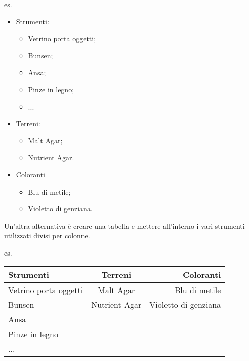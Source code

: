 es.
\begin{multicols}{2}
\begin{itemize}
    \item Strumenti:
    \begin{itemize}
        \item Vetrino porta oggetti;
        \item Bunsen;
        \item Ansa;
        \item Pinze in legno;
        \item ...
    \end{itemize}
    \item Terreni:
    \begin{itemize}
    \item Malt Agar;
    \item Nutrient Agar.
    \end{itemize}
    \item Coloranti
    \begin{itemize}
        \item Blu di metile;
        \item Violetto di genziana.
    \end{itemize}
\end{itemize}
\end{multicols}

Un'altra alternativa è creare una tabella e mettere all'interno i vari strumenti utilizzati divisi per colonne.

es.
\begin{center}
   \begin{tabular}{l|c|r}
   \toprule
     \textbf{Strumenti} &  \textbf{Terreni} & \textbf{Coloranti}\\
    \midrule
     Vetrino porta oggetti & Malt Agar & Blu di metile\\
     Bunsen & Nutrient Agar & Violetto di genziana\\
     Ansa & & \\
     Pinze in legno & & \\
     ... & & \\
     \bottomrule
    \end{tabular} 
\end{center}